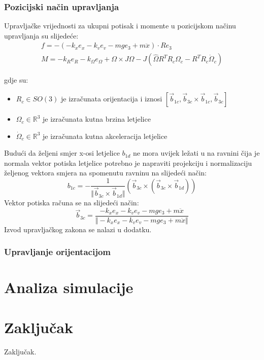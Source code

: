 \documentclass[times, utf8, diplomski]{fer}
\begin{document}
	\subsection{Pozicijski način upravljanja}
	Upravljačke vrijednosti za ukupni potisak i momente u pozicijskom načinu upravljanja su slijedeće:
	\begin{gather}
		f = - (- k_x e_x - k_v e_v - mg e_3 + m \ddot{x}) \cdot Re_3 \label{thrust_ctrl} \\
		M = -k_R e_R - k_\Omega e_\Omega + \Omega \times J \Omega - J(\hat{\Omega}R^TR_c\Omega_c - R^TR_c\dot{\Omega}_c)
	\end{gather}
	
	gdje su:
	\begin{itemize}
		\item $R_c \in SO(3)$ je izračunata orijentacija i iznosi $[\vec{b}_{1c}, \vec{b}_{3c} \times \vec{b}_{1c}, \vec{b}_{3c}]$ 
		\item $\Omega_c \in \mathbb{R}^3$ je izračunata kutna brzina letjelice 
		\item $\dot{\Omega}_c \in \mathbb{R}^3$ je izračunata kutna akceleracija letjelice
	\end{itemize}
	Budući da željeni smjer x-osi letjelice $b_{1d}$ ne mora uvijek ležati u na ravnini čija je normala vektor potiska letjelice potrebno je napraviti projekciju i normalizaciju željenog vektora smjera na spomenutu ravninu na slijedeći način:
	\begin{equation}
		b_{1c} = - \frac{1}{\Vert \vec{b}_{3c} \times \vec{b}_{1d} \Vert}(\vec{b}_{3c} \times (\vec{b}_{3c} \times \vec{b}_{1d}))
	\end{equation}
	Vektor potiska računa se na slijedeći način:
	\begin{equation}
		\vec{b}_{3c} = \frac{- k_x e_x - k_v e_v - mg e_3 + m \ddot{x}}{\Vert - k_x e_x - k_v e_v - mg e_3 + m \ddot{x} \Vert}
	\end{equation}
	Izvod upravljačkog zakona se nalazi u dodatku.
	
	\subsection{Upravljanje orijentacijom}
\chapter{Analiza simulacije}
\chapter{Zaključak}
Zaključak.
\end{document}
